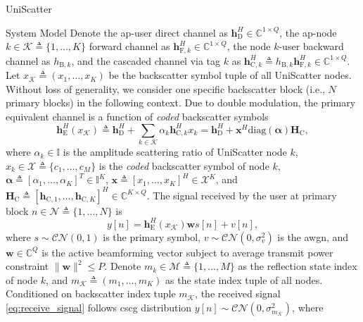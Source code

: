 \documentclass[journal]{IEEEtran}
\begin{document}
\begin{section}{UniScatter}
\begin{subsection}{System Model}
		Denote the \gls{ap}-user direct channel as $\boldsymbol{h}_{\mathrm{D}}^H \in \mathbb{C}^{1 \times Q}$, the \gls{ap}-node $k \in \mathcal{K} \triangleq \{1,\ldots,K\}$ forward channel as $\boldsymbol{h}_{\mathrm{F},k}^H \in \mathbb{C}^{1 \times Q}$, the node $k$-user backward channel as $h_{\mathrm{B},k}$, and the cascaded channel via tag $k$ as $\boldsymbol{h}_{\mathrm{C},k}^H \triangleq h_{\mathrm{B},k} \boldsymbol{h}_{\mathrm{F},k}^H \in \mathbb{C}^{1 \times Q}$.
		Let $x_{\mathcal{K}} \triangleq (x_1,\ldots,x_K)$ be the backscatter symbol tuple of all UniScatter nodes.
		Without loss of generality, we consider one specific backscatter block (i.e., $N$ primary blocks) in the following context.
		Due to double modulation, the primary equivalent channel is a function of \emph{coded} backscatter symbols
		\begin{equation}
			\boldsymbol{h}_{\mathrm{E}}^H(x_{\mathcal{K}}) \triangleq \boldsymbol{h}_{\mathrm{D}}^H + \sum_{k \in \mathcal{K}} \alpha_k \boldsymbol{h}_{\mathrm{C},k}^H x_k = \boldsymbol{h}_{\mathrm{D}}^H + \boldsymbol{x}^H \mathrm{diag}(\boldsymbol{\alpha}) \boldsymbol{H}_{\mathrm{C}},
			\label{eq:equivalent_channel}
		\end{equation}
		where $\alpha_k \in \mathbb{I}$ is the amplitude scattering ratio of UniScatter node $k$, $x_k \in \mathcal{X} \triangleq \{c_1,\ldots,c_M\}$ is the \emph{coded} backscatter symbol of node $k$, $\boldsymbol{\alpha} \triangleq [\alpha_1,\ldots,\alpha_K]^T \in \mathbb{I}^{K}$, $\boldsymbol{x} \triangleq [x_1,\ldots,x_K]^H \in \mathcal{X}^{K}$, and $\boldsymbol{H}_{\mathrm{C}} \triangleq [\boldsymbol{h}_{\mathrm{C},1},\ldots,\boldsymbol{h}_{\mathrm{C},K}]^H \in \mathbb{C}^{K \times Q}$. The signal received by the user at primary block $n \in \mathcal{N} \triangleq \{1,\ldots,N\}$ is
		\begin{equation}
			y[n] = \boldsymbol{h}_{\mathrm{E}}^H(x_{\mathcal{K}}) \boldsymbol{w} s[n] + v[n],
			\label{eq:receive_signal}
		\end{equation}
		where $s \sim \mathcal{CN}(0,1)$ is the primary symbol, $v \sim \mathcal{CN}(0,\sigma_v^2)$ is the \gls{awgn}, and $\boldsymbol{w} \in \mathbb{C}^{Q}$ is the active beamforming vector subject to average transmit power constraint $\lVert \boldsymbol{w} \rVert^2 \le P$.
		Denote $m_k \in \mathcal{M} \triangleq \{1,\ldots,M\}$ as the reflection state index of node $k$, and $m_{\mathcal{K}} \triangleq (m_1,\ldots,m_K)$ as the state index tuple of all nodes.
		Conditioned on backscatter index tuple $m_{\mathcal{K}}$, the received signal \eqref{eq:receive_signal} follows \gls{cscg} distribution $y[n] \sim \mathcal{CN}(0,\sigma_{m_{\mathcal{K}}}^2)$, where

\end{subsection}
\end{section}
\end{document}
